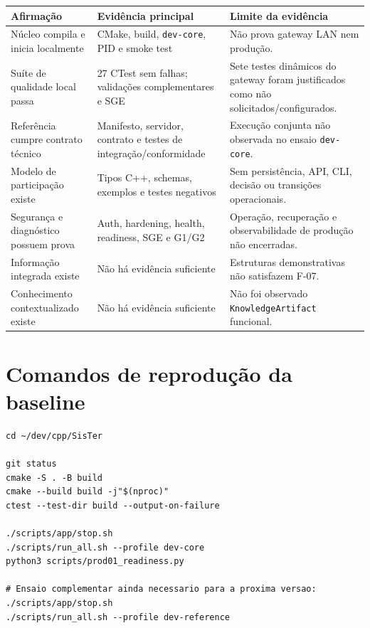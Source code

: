 \documentclass[11pt,a4paper,oneside]{article}
\begin{document}
\begin{longtable}{P{4.5cm}P{4.2cm}P{5.8cm}}
\toprule
\textbf{Afirmação} & \textbf{Evidência principal} & \textbf{Limite da evidência} \\
\midrule
\endhead
Núcleo compila e inicia localmente & CMake, build, \texttt{dev-core}, PID e smoke test & Não prova gateway LAN nem produção. \\
Suíte de qualidade local passa & 27 CTest sem falhas; validações complementares e SGE & Sete testes dinâmicos do gateway foram justificados como não solicitados/configurados. \\
Referência cumpre contrato técnico & Manifesto, servidor, contrato e testes de integração/conformidade & Execução conjunta não observada no ensaio \texttt{dev-core}. \\
Modelo de participação existe & Tipos C++, schemas, exemplos e testes negativos & Sem persistência, API, CLI, decisão ou transições operacionais. \\
Segurança e diagnóstico possuem prova & Auth, hardening, health, readiness, SGE e G1/G2 & Operação, recuperação e observabilidade de produção não encerradas. \\
Informação integrada existe & Não há evidência suficiente & Estruturas demonstrativas não satisfazem F-07. \\
Conhecimento contextualizado existe & Não há evidência suficiente & Não foi observado \texttt{KnowledgeArtifact} funcional. \\
\bottomrule
\end{longtable}

\section{Comandos de reprodução da baseline}

\begin{lstlisting}
cd ~/dev/cpp/SisTer

git status
cmake -S . -B build
cmake --build build -j"$(nproc)"
ctest --test-dir build --output-on-failure

./scripts/app/stop.sh
./scripts/run_all.sh --profile dev-core
python3 scripts/prod01_readiness.py

# Ensaio complementar ainda necessario para a proxima versao:
./scripts/app/stop.sh
./scripts/run_all.sh --profile dev-reference
\end{lstlisting}
\end{document}
